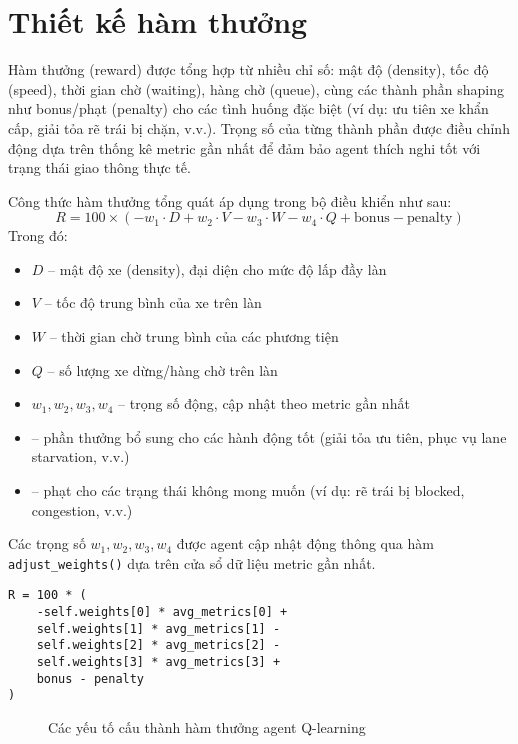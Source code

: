 \section{Thiết kế hàm thưởng}

Hàm thưởng (reward) được tổng hợp từ nhiều chỉ số: mật độ (density), tốc độ (speed), thời gian chờ (waiting), hàng chờ (queue), cùng các thành phần shaping như bonus/phạt (penalty) cho các tình huống đặc biệt (ví dụ: ưu tiên xe khẩn cấp, giải tỏa rẽ trái bị chặn, v.v.). Trọng số của từng thành phần được điều chỉnh động dựa trên thống kê metric gần nhất để đảm bảo agent thích nghi tốt với trạng thái giao thông thực tế.

Công thức hàm thưởng tổng quát áp dụng trong bộ điều khiển như sau:
\[
R = 100 \times \left(
    -w_1 \cdot D
    + w_2 \cdot V
    - w_3 \cdot W
    - w_4 \cdot Q
    + \text{bonus}
    - \text{penalty}
\right)
\]
Trong đó:
\begin{itemize}
    \item $D$ -- mật độ xe (density), đại diện cho mức độ lấp đầy làn
    \item $V$ -- tốc độ trung bình của xe trên làn
    \item $W$ -- thời gian chờ trung bình của các phương tiện
    \item $Q$ -- số lượng xe dừng/hàng chờ trên làn
    \item $w_1, w_2, w_3, w_4$ -- trọng số động, cập nhật theo metric gần nhất
    \item {} -- phần thưởng bổ sung cho các hành động tốt (giải tỏa ưu tiên, phục vụ lane starvation, v.v.)
    \item {} -- phạt cho các trạng thái không mong muốn (ví dụ: rẽ trái bị blocked, congestion, v.v.)
\end{itemize}
Các trọng số $w_1, w_2, w_3, w_4$ được agent cập nhật động thông qua hàm \texttt{adjust\_weights()} dựa trên cửa sổ dữ liệu metric gần nhất.

\begin{lstlisting}[style=py,caption={Công thức tính reward đa mục tiêu}]
R = 100 * (
    -self.weights[0] * avg_metrics[0] +
    self.weights[1] * avg_metrics[1] -
    self.weights[2] * avg_metrics[2] -
    self.weights[3] * avg_metrics[3] +
    bonus - penalty
)
\end{lstlisting}

\begin{figure}[H]
    \centering
    \caption{Các yếu tố cấu thành hàm thưởng agent Q-learning}
\end{figure}